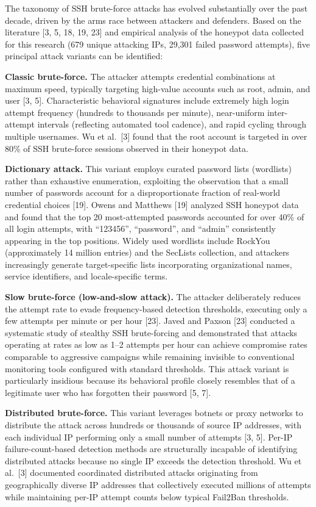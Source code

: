 \documentclass[
  a4paper]{report}
\begin{document}
The taxonomy of SSH brute-force attacks has evolved substantially over
the past decade, driven by the arms race between attackers and
defenders. Based on the literature {[}3, 5, 18, 19, 23{]} and empirical
analysis of the honeypot data collected for this research (679 unique
attacking IPs, 29,301 failed password attempts), five principal attack
variants can be identified:

\textbf{Classic brute-force.} The attacker attempts credential
combinations at maximum speed, typically targeting high-value accounts
such as root, admin, and user {[}3, 5{]}. Characteristic behavioral
signatures include extremely high login attempt frequency (hundreds to
thousands per minute), near-uniform inter-attempt intervals (reflecting
automated tool cadence), and rapid cycling through multiple usernames.
Wu et al.~{[}3{]} found that the root account is targeted in over 80\%
of SSH brute-force sessions observed in their honeypot data.

\textbf{Dictionary attack.} This variant employs curated password lists
(wordlists) rather than exhaustive enumeration, exploiting the
observation that a small number of passwords account for a
disproportionate fraction of real-world credential choices {[}19{]}.
Owens and Matthews {[}19{]} analyzed SSH honeypot data and found that
the top 20 most-attempted passwords accounted for over 40\% of all login
attempts, with ``123456'', ``password'', and ``admin'' consistently
appearing in the top positions. Widely used wordlists include RockYou
(approximately 14 million entries) and the SecLists collection, and
attackers increasingly generate target-specific lists incorporating
organizational names, service identifiers, and locale-specific terms.

\textbf{Slow brute-force (low-and-slow attack).} The attacker
deliberately reduces the attempt rate to evade frequency-based detection
thresholds, executing only a few attempts per minute or per hour
{[}23{]}. Javed and Paxson {[}23{]} conducted a systematic study of
stealthy SSH brute-forcing and demonstrated that attacks operating at
rates as low as 1--2 attempts per hour can achieve compromise rates
comparable to aggressive campaigns while remaining invisible to
conventional monitoring tools configured with standard thresholds. This
attack variant is particularly insidious because its behavioral profile
closely resembles that of a legitimate user who has forgotten their
password {[}5, 7{]}.

\textbf{Distributed brute-force.} This variant leverages botnets or
proxy networks to distribute the attack across hundreds or thousands of
source IP addresses, with each individual IP performing only a small
number of attempts {[}3, 5{]}. Per-IP failure-count-based detection
methods are structurally incapable of identifying distributed attacks
because no single IP exceeds the detection threshold. Wu et al.~{[}3{]}
documented coordinated distributed attacks originating from
geographically diverse IP addresses that collectively executed millions
of attempts while maintaining per-IP attempt counts below typical
Fail2Ban thresholds.
\end{document}
